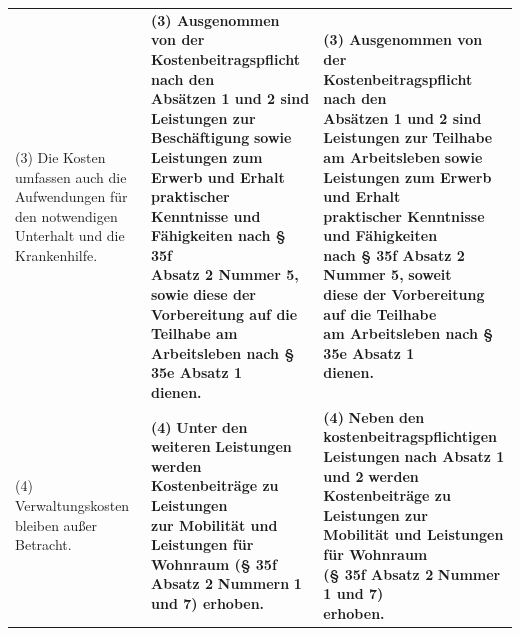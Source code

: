 \documentclass[10pt,a4paper,landscape]{article}
\begin{document}
\begin{longtable}{|L{8.2cm}|L{8.2cm}|L{8.2cm}|}
(3) \textcolor{diffred}{Die Kosten umfassen auch} die  \newline \textcolor{diffred}{Aufwendungen für den notwendigen  \newline Unterhalt und die Krankenhilfe.} & \textbf{(3) Ausgenommen von der  \newline Kostenbeitragspflicht nach den  \newline Absätzen 1 und 2 sind Leistungen zur} \newline \textbf{\textcolor{diffred}{Beschäftigung}}\textbf{ sowie Leistungen zum  \newline Erwerb und Erhalt praktischer  \newline Kenntnisse und Fähigkeiten nach \S{} 35f  \newline Absatz 2 Nummer 5, }\textbf{\textcolor{diffred}{sowie}}\textbf{ diese der  \newline Vorbereitung auf die Teilhabe am  \newline Arbeitsleben nach \S{} 35e Absatz 1  \newline dienen. } & \textbf{(3) Ausgenommen von der  \newline Kostenbeitragspflicht nach den  \newline Absätzen 1 und 2 sind Leistungen zur} \newline \textbf{\textcolor{diffgreen}{Teilhabe am Arbeitsleben}}\textbf{ sowie  \newline Leistungen zum Erwerb und Erhalt  \newline praktischer Kenntnisse und Fähigkeiten  \newline nach \S{} 35f Absatz 2 Nummer 5, }\textbf{\textcolor{diffgreen}{soweit}}\textbf{  \newline diese der Vorbereitung auf die Teilhabe  \newline am Arbeitsleben nach \S{} 35e Absatz 1  \newline dienen. } \\
\hhline{|---|}
(4) \textcolor{diffred}{Verwaltungskosten bleiben außer  \newline Betracht.} & \textbf{(4) }\textbf{\textcolor{diffred}{Unter}}\textbf{ den }\textbf{\textcolor{diffred}{weiteren}}\textbf{ Leistungen  \newline werden Kostenbeiträge zu Leistungen  \newline zur Mobilität und Leistungen für  \newline Wohnraum (\S{} 35f Absatz 2 }\textbf{\textcolor{diffred}{Nummern}}\textbf{ 1  \newline und 7) erhoben. } & \textbf{(4) }\textbf{\textcolor{diffgreen}{Neben}}\textbf{ den }\textbf{\textcolor{diffgreen}{kostenbeitragspflichtigen}}\textbf{  \newline Leistungen }\textbf{\textcolor{diffgreen}{nach Absatz 1 und 2}}\textbf{ werden  \newline Kostenbeiträge zu Leistungen zur  \newline Mobilität und Leistungen für Wohnraum  \newline (\S{} 35f Absatz 2 }\textbf{\textcolor{diffgreen}{Nummer}}\textbf{ 1 und 7)  \newline erhoben. } \\

\end{longtable}
\end{document}
